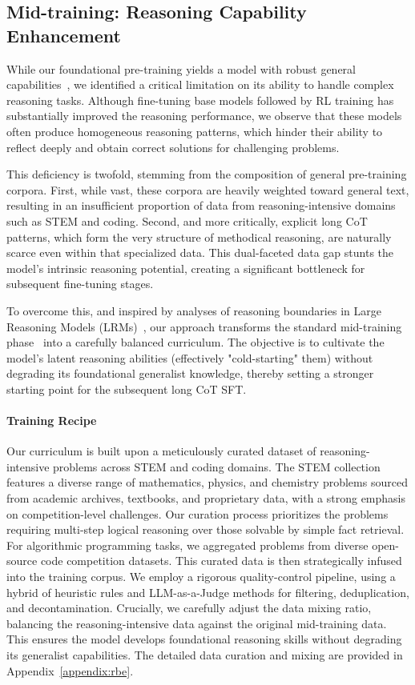 \subsection{Mid-training: Reasoning Capability Enhancement}

While our foundational pre-training yields a model with robust general capabilities~\citep{meituan2025longcat_flash_chat}, we identified a critical limitation on its ability to handle complex reasoning tasks. Although fine-tuning base models followed by RL training has substantially improved the reasoning performance, we observe that these models often produce homogeneous reasoning patterns, which hinder their ability to reflect deeply and obtain correct solutions for challenging problems.

This deficiency is twofold, stemming from the composition of general pre-training corpora. 
First, while vast, these corpora are heavily weighted toward general text, resulting in an insufficient proportion of data from reasoning-intensive domains such as STEM and coding. 
Second, and more critically, explicit long CoT patterns, which form the very structure of methodical reasoning, are naturally scarce even within that specialized data. 
This dual-faceted data gap stunts the model’s intrinsic reasoning potential, creating a significant bottleneck for subsequent fine-tuning stages. 

To overcome this, and inspired by analyses of reasoning boundaries in Large Reasoning Models (LRMs)~\citep{yue2025does}, our approach transforms the standard mid-training phase~\citep{meituan2025longcat_flash_chat} into a carefully balanced curriculum. 
The objective is to cultivate the model's latent reasoning abilities (effectively "cold-starting" them) without degrading its foundational generalist knowledge, thereby setting a stronger starting point for the subsequent long CoT SFT.

\noindent\paragraph{Training Recipe}
Our curriculum is built upon a meticulously curated dataset of reasoning-intensive problems across STEM and coding domains. 
The STEM collection features a diverse range of mathematics, physics, and chemistry problems sourced from academic archives, textbooks, and proprietary data, with a strong emphasis on competition-level challenges. 
Our curation process prioritizes the problems requiring multi-step logical reasoning over those solvable by simple fact retrieval.
For algorithmic programming tasks, we aggregated problems from diverse open-source code competition datasets.
This curated data is then strategically infused into the training corpus. 
We employ a rigorous quality-control pipeline, using a hybrid of heuristic rules and LLM-as-a-Judge methods for filtering, deduplication, and decontamination.
Crucially, we carefully adjust the data mixing ratio, balancing the reasoning-intensive data against the original mid-training data. 
This ensures the model develops foundational reasoning skills without degrading its generalist capabilities.
The detailed data curation and mixing are provided in Appendix~\ref{appendix:rbe}.

